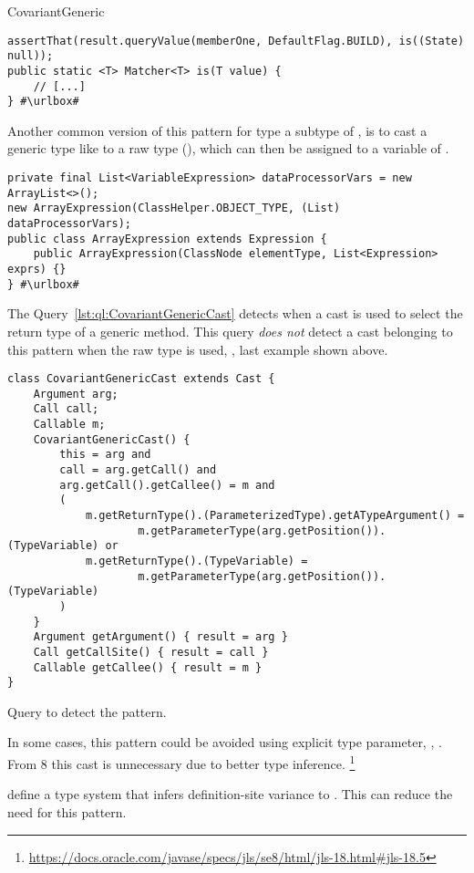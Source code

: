 \begin{pattern}{CovariantGeneric}
\def\urlvar{http://bit.ly/EngineHub_WorldGuard_2IVUOx1}
\begin{verbatim}
assertThat(result.queryValue(memberOne, DefaultFlag.BUILD), is((State) null));
public static <T> Matcher<T> is(T value) {
    // [...]
} #\urlbox#
\end{verbatim}

Another common version of this pattern for type  a subtype of ,
is to cast a generic type like  to a raw type (),
which can then be assigned to a variable of .
\def\urlvar{http://bit.ly/spockframework_spock_2UYEsF5}
\begin{verbatim}
private final List<VariableExpression> dataProcessorVars = new ArrayList<>();
new ArrayExpression(ClassHelper.OBJECT_TYPE, (List) dataProcessorVars);
public class ArrayExpression extends Expression {
    public ArrayExpression(ClassNode elementType, List<Expression> exprs) {}
} #\urlbox#
\end{verbatim}


\detection{}
The Query~\ref{lst:ql:CovariantGenericCast} detects when a cast is used to select the return type of a generic method.
This query \emph{does not} detect a cast belonging to this pattern when the raw type is used, \eg{}, last example shown above.

\begin{listing}
\begin{verbatim}
class CovariantGenericCast extends Cast {
	Argument arg;
	Call call;
	Callable m;
	CovariantGenericCast() {
		this = arg and
		call = arg.getCall() and
		arg.getCall().getCallee() = m and
		(
			m.getReturnType().(ParameterizedType).getATypeArgument() =
					m.getParameterType(arg.getPosition()).(TypeVariable) or
			m.getReturnType().(TypeVariable) =
					m.getParameterType(arg.getPosition()).(TypeVariable)
		)
	}
	Argument getArgument() { result = arg }
	Call getCallSite() { result = call }
	Callable getCallee() { result = m }
}
\end{verbatim}
\caption{Query to detect the \thisp{} pattern.}
\label{lst:ql:CovariantGenericCast}
\end{listing}


\issues{}
In some cases, this pattern could be avoided using explicit type parameter,
\eg, .
From \java{} 8 this cast is unnecessary due to better type inference.%
\footnote{\url{https://docs.oracle.com/javase/specs/jls/se8/html/jls-18.html\#jls-18.5}}

\cite{altidorTamingWildcardsCombining2011} define a type system that infers definition-site variance to \java{}.
This can reduce the need for this pattern.

\end{pattern}